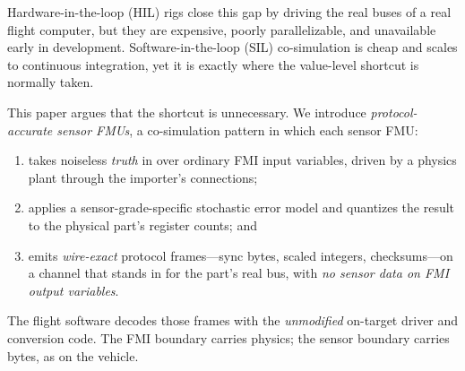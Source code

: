 \documentclass[preprint,12pt,a4paper]{elsarticle}
\begin{document}
Hardware-in-the-loop (HIL) rigs close this gap by driving the real buses of a
real flight computer, but they are expensive, poorly parallelizable, and
unavailable early in development. Software-in-the-loop (SIL) co-simulation is
cheap and scales to continuous integration, yet it is exactly where the
value-level shortcut is normally taken.

This paper argues that the shortcut is unnecessary. We introduce
\emph{protocol-accurate sensor FMUs}, a co-simulation pattern in which each
sensor FMU:
\begin{enumerate}
  \item takes noiseless \emph{truth} in over ordinary FMI input variables,
        driven by a physics plant through the importer's connections;
  \item applies a sensor-grade-specific stochastic error model and quantizes
        the result to the physical part's register counts; and
  \item emits \emph{wire-exact} protocol frames---sync bytes, scaled integers,
        checksums---on a channel that stands in for the part's real bus, with
        \emph{no sensor data on FMI output variables}.
\end{enumerate}
The flight software decodes those frames with the \emph{unmodified} on-target
driver and conversion code. The FMI boundary carries physics; the sensor
boundary carries bytes, as on the vehicle.
\end{document}
